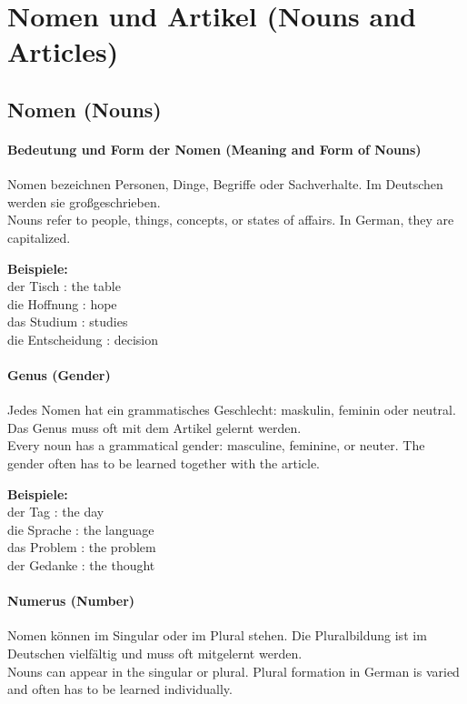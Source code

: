 \documentclass[a4paper]{article}
\begin{document}
    
    \section{Nomen und Artikel {\small (Nouns and Articles)}}
    
    \subsection{Nomen {\small (Nouns)}}
        
        \paragraph{Bedeutung und Form der Nomen {\small (Meaning and Form of Nouns)}}
            Nomen bezeichnen Personen, Dinge, Begriffe oder Sachverhalte. Im Deutschen werden sie großgeschrieben.\\
            Nouns refer to people, things, concepts, or states of affairs. In German, they are capitalized.
            
            \textbf{Beispiele:}\\
            der Tisch : the table\\
            die Hoffnung : hope\\
            das Studium : studies\\
            die Entscheidung : decision
        
        \paragraph{Genus {\small (Gender)}}
            Jedes Nomen hat ein grammatisches Geschlecht: maskulin, feminin oder neutral. Das Genus muss oft mit dem Artikel gelernt werden.\\
            Every noun has a grammatical gender: masculine, feminine, or neuter. The gender often has to be learned together with the article.
            
            \textbf{Beispiele:}\\
            der Tag : the day\\
            die Sprache : the language\\
            das Problem : the problem\\
            der Gedanke : the thought
        
        \paragraph{Numerus {\small (Number)}}
            Nomen können im Singular oder im Plural stehen. Die Pluralbildung ist im Deutschen vielfältig und muss oft mitgelernt werden.\\
            Nouns can appear in the singular or plural. Plural formation in German is varied and often has to be learned individually.
            
\end{document}
